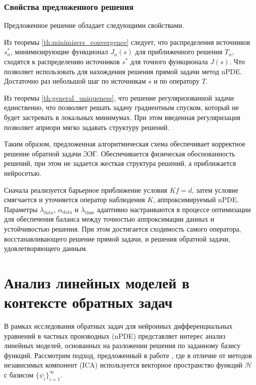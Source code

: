 \documentclass[a4paper,14pt,oneside,openany]{extarticle}
\begin{document}
\subsubsection{Свойства предложенного решения}

Предложенное решение обладает следующими свойствами.

Из теоремы \ref{th:minimizers_convergence} следует, что распределения источников $s_n^*$, 
минимизирующие функционал $J_n(s)$ для приближенного решения $T_n$,
сходятся к распределению источников $s^*$ для точного функционала $J(s)$. 
Что позволяет использовать для нахождения решения прямой задачи метод nPDE.
Достаточно раз небольшой шаг по источникам $s$ и по оператору $T$. 

Из теоремы \ref{th:general_uniqueness}, что решение регуляризованной задачи единственно, 
что позволяет решать задачу градиентным спуском, 
который не будет застревать в локальных минимумах. При этом введенная регуляризация позволяет 
априори мягко задавать структуру решений.

Таким образом, предложенная алгоритмическая схема обеспечивает корректное решение обратной задачи ЭЭГ. 
Обеспечивается физическая обоснованность решений,
при этом не задается жесткая структура решений, а приближается нейросетью.

Сначала реализуется барьерное приближение условия $Kf=d$, затем условие смягчается и уточняется оператор наблюдения $K$, 
аппроксимируемый nPDE. Параметры $\lambda_{\mathrm{data}}$, 
$\alpha_{\mathrm{data}}$ и $\lambda_{\mathrm{time}}$ адаптивно 
настраиваются в процессе оптимизации для обеспечения баланса между точностью аппроксимации данных и устойчивостью решения. 
При этом достигается сходимость самого оператора, восстанавливающего
решение прямой задачи, и решения обратной задачи, удовлетворяющего данным.

\newpage
\section{Анализ линейных моделей в контексте обратных задач}

В рамках исследования обратных задач для нейронных дифференциальных уравнений в частных производных (nPDE) представляет интерес анализ 
линейных моделей, основанных на разложении решения по заданному базису функций. Рассмотрим подход, предложенный в работе \cite{Palummo2024}, 
где в отличие от методов независимых компонент (ICA) используется векторное пространство функций $\mathcal{H}$ с базисом $\{\psi_i\}_{i=1}^\infty$.
\end{document}
